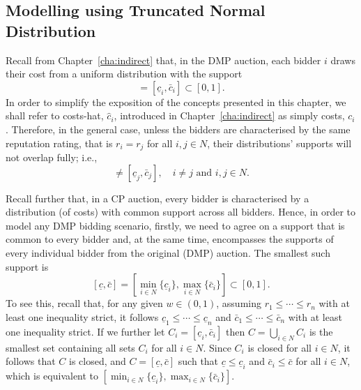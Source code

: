 \subsection{Modelling using Truncated Normal Distribution} %
\label{sub:modeling_using_truncated_normal_distribution_approximation}
Recall from Chapter~\ref{cha:indirect} that, in the DMP auction, each bidder $i$ draws their cost from a uniform distribution with the support
\begin{equation*}
  [(1-w)r_i, (1-w)r_i + w] = [\underline{c}_i, \bar{c}_i] \subset [0,1].
\end{equation*}
In order to simplify the exposition of the concepts presented in this chapter, we shall refer to costs-hat, $\hat{c}_i$, introduced in Chapter~\ref{cha:indirect} as simply costs, $c_i$. Therefore, in the general case, unless the bidders are characterised by the same reputation rating, that is $r_i=r_j$ for all $i,j\in N$, their distributions' supports will not overlap fully; i.e.,
\begin{equation*}
  [\underline{c}_i,\bar{c}_i] \neq [\underline{c}_j,\bar{c}_j], \quad i\neq j \text{ and } i,j\in N.
\end{equation*}

Recall further that, in a CP auction, every bidder is characterised by a distribution (of costs) with common support across all bidders. Hence, in order to model any DMP bidding scenario, firstly, we need to agree on a support that is common to every bidder and, at the same time, encompasses the supports of every individual bidder from the original (DMP) auction. The smallest such support is
\begin{equation}
  \label{eq:domain_common_priors_approximation}
  [\underline{c},\bar{c}] = \displaystyle\left[\min_{i\in N}\{\underline{c}_i\}, \max_{i\in N}\{\bar{c}_i\}\right] \subset [0,1].
\end{equation}
To see this, recall that, for any given $w\in (0,1)$, assuming $r_1\leq\cdots\leq r_n$ with at least one inequality strict, it follows $\underline{c}_1\leq\cdots\leq\underline{c}_n$ and $\bar{c}_1\leq\cdots\leq\bar{c}_n$ with at least one inequality strict. If we further let $C_i = [\underline{c}_i, \bar{c}_i]$ then $C = \bigcup_{i\in N} C_i$ is the smallest set containing all sets $C_i$ for all $i\in N$. Since $C_i$ is closed for all $i\in N$, it follows that $C$ is closed, and $C = [\underline{c}, \bar{c}]$ such that $\underline{c} \leq \underline{c}_i$ and $\bar{c}_i\leq \bar{c}$ for all $i\in N$, which is equivalent to $[\min_{i\in N}\{\underline{c}_i\}, \max_{i\in N}\{\bar{c}_i\}]$.

